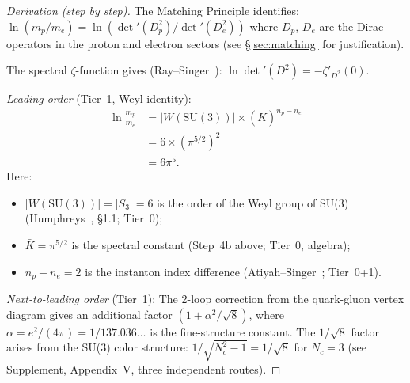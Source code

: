 \documentclass[11pt,a4paper]{article}
\theoremstyle{definition}
\theoremstyle{remark}
\begin{document}
\begin{proof}[Derivation (step by step)]
The Matching Principle identifies:
$\ln(m_p/m_e) = \ln(\det'(D_p^2)/\det'(D_e^2))$
where $D_p$, $D_e$ are the Dirac operators in the proton and
electron sectors (see \S\ref{sec:matching} for justification).

The spectral $\zeta$-function gives (Ray--Singer~\cite{RaySinger1971}):
$\ln\det'(D^2) = -\zeta'_{D^2}(0)$.

\emph{Leading order} (Tier~1, Weyl identity):
\begin{align}
  \ln\frac{m_p}{m_e}
  &= |W(\mathrm{SU}(3))| \times (\bar K)^{n_p - n_e}
  \label{eq:LO1}\\
  &= 6 \times (\pi^{5/2})^2
  \label{eq:LO2}\\
  &= 6\pi^5.
  \label{eq:LO3}
\end{align}
Here:
\begin{itemize}
\item $|W(\mathrm{SU}(3))| = |S_3| = 6$ is the order of the Weyl group
  of SU(3) (Humphreys~\cite{Humphreys1990}, \S 1.1; Tier~0);
\item $\bar K = \pi^{5/2}$ is the spectral constant
  (Step~4b above; Tier~0, algebra);
\item $n_p - n_e = 2$ is the instanton index difference
  (Atiyah--Singer~\cite{AtiyahSinger1968}; Tier~0+1).
\end{itemize}

\emph{Next-to-leading order} (Tier~1):
The 2-loop correction from the quark-gluon vertex diagram gives
an additional factor $(1 + \alpha^2/\!\sqrt{8})$, where
$\alpha = e^2/(4\pi) = 1/137.036\ldots$ is the fine-structure constant.
The $1/\!\sqrt{8}$ factor arises from the SU(3) color structure:
$1/\!\sqrt{N_c^2 - 1} = 1/\!\sqrt{8}$ for $N_c = 3$
(see Supplement, Appendix~V, three independent routes).
\end{proof}
\end{document}
